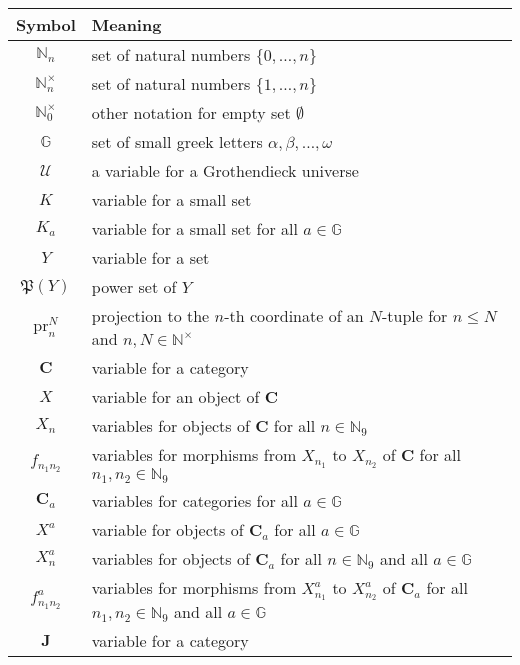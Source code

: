 \begin{longtable}{cl}
  \hline
  Symbol
  &
  Meaning
  \\
  \hline
  \endhead
  \hline
  \endfoot
  $\mathbb{N}_{n}$
  &
  set of natural numbers $\lbrace 0,\ldots,n \rbrace$
  \\[5pt]
  $\mathbb{N}_{n}^{\times}$
  &
  set of natural numbers $\lbrace 1,\ldots,n \rbrace$
  \\[5pt]
  $\mathbb{N}_{0}^{\times}$
  &
  other notation for empty set $\emptyset$
  \\[5pt]
  $\mathbb{G}$
  &
  set of small greek letters $\alpha,\beta,\ldots,\omega$
  \\[5pt]
  $\mathcal{U}$
  &
  a variable for a Grothendieck universe
  \\[5pt]
  $K$
  &
  variable for a small set
  \\[5pt]
  $K_{a}$
  &
  variable for a small set for all $a \in \mathbb{G}$
  \\[5pt]
  $Y$
  &
  variable for a set
  \\[5pt]
  $\mathfrak{P}(Y)$
  &
  power set of $Y$
  \\[5pt]
  $\mathrm{pr}_{n}^{N}$
  &
  projection to the $n$-th coordinate of an $N$-tuple
  for $n \leq N$ and $n,N \in \mathbb{N}^{\times}$
  \\[5pt]
  $\mathbf{C}$
  &
  variable for a category
  \\[5pt]
  $X$
  &
  variable for an object of $\mathbf{C}$
  \\[5pt]
  $X_{n}$
  &
  variables for objects of $\mathbf{C}$ for all $n \in \mathbb{N}_{9}$
  \\[5pt]
  $f_{n_{1}n_{2}}$
  &
  variables for morphisms from $X_{n_{1}}$ to $X_{n_{2}}$ of
  $\mathbf{C}$ for all $n_{1},n_{2} \in \mathbb{N}_{9}$
  \\[5pt]
  $\mathbf{C}_{a}$
  &
  variables for categories for all $a \in \mathbb{G}$
  \\[5pt]
  $X^{a}$
  &
  variable for objects of $\mathbf{C}_{a}$ for all $a \in \mathbb{G}$
  \\[5pt]
  $X_{n}^{a}$
  &
  variables for objects of $\mathbf{C}_{a}$
  for all $n \in \mathbb{N}_{9}$ and all $a \in \mathbb{G}$
  \\[5pt]
  $f_{n_{1}n_{2}}^{a}$
  &
  variables for morphisms from $X_{n_{1}}^{a}$ to $X_{n_{2}}^{a}$
  of $\mathbf{C}_{a}$
  for all $n_{1},n_{2} \in \mathbb{N}_{9}$ and all $a \in \mathbb{G}$
  \\[5pt]
  $\mathbf{J}$
  &
  variable for a category

\end{longtable}
